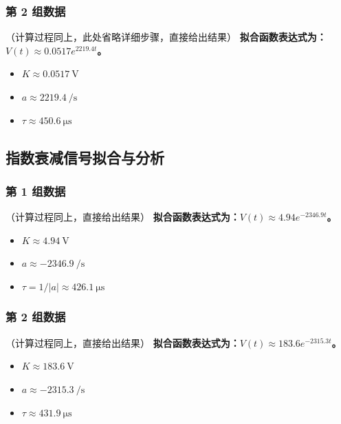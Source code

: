 \documentclass[12pt, a4paper]{ctexrep}
\begin{document}
\subsubsection{第 2 组数据}
（计算过程同上，此处省略详细步骤，直接给出结果）
\textbf{拟合函数表达式为：$V(t) \approx 0.0517 e^{2219.4 t}$。}
\begin{itemize}
    \item $K \approx \SI{0.0517}{\volt}$
    \item $a \approx \SI{2219.4}{\per\second}$
    \item $\tau \approx \SI{450.6}{\micro\second}$
\end{itemize}

\subsection{指数衰减信号拟合与分析}
\subsubsection{第 1 组数据}
（计算过程同上，直接给出结果）
\textbf{拟合函数表达式为：$V(t) \approx 4.94 e^{-2346.9 t}$。}
\begin{itemize}
    \item $K \approx \SI{4.94}{\volt}$
    \item $a \approx \SI{-2346.9}{\per\second}$
    \item $\tau = 1/|a| \approx \SI{426.1}{\micro\second}$
\end{itemize}

\subsubsection{第 2 组数据}
（计算过程同上，直接给出结果）
\textbf{拟合函数表达式为：$V(t) \approx 183.6 e^{-2315.3 t}$。}
\begin{itemize}
    \item $K \approx \SI{183.6}{\volt}$
    \item $a \approx \SI{-2315.3}{\per\second}$
    \item $\tau \approx \SI{431.9}{\micro\second}$
\end{itemize}
\end{document}
